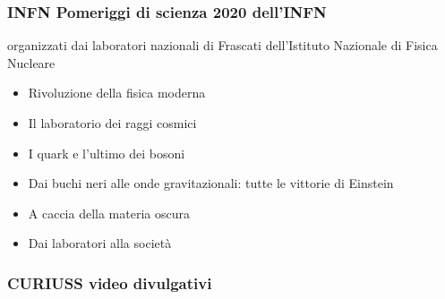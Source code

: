 \documentclass[letterpaper,10pt,italian]{jupyterBook}
\begin{document}
\sphinxAtStartPar
{}
\subsubsection*{INFN \sphinxhyphen{} Pomeriggi di scienza 2020 dell’INFN}

\sphinxAtStartPar
{} organizzati dai laboratori nazionali di Frascati dell’Istituto Nazionale di Fisica Nucleare
\begin{itemize}
\item {} 
\sphinxAtStartPar
Rivoluzione della fisica moderna

\item {} 
\sphinxAtStartPar
Il laboratorio dei raggi cosmici

\item {} 
\sphinxAtStartPar
I quark e l’ultimo dei bosoni

\item {} 
\sphinxAtStartPar
Dai buchi neri alle onde gravitazionali: tutte le vittorie di Einstein

\item {} 
\sphinxAtStartPar
A caccia della materia oscura

\item {} 
\sphinxAtStartPar
Dai laboratori alla società

\end{itemize}
\subsubsection*{CURIUSS \sphinxhyphen{} video divulgativi}
\end{document}
